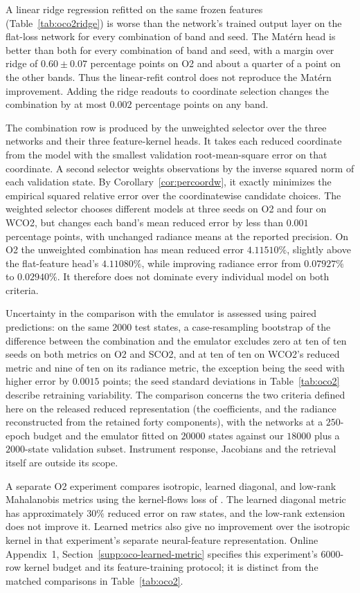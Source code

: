 \documentclass[twoside,11pt]{article}
\begin{document}
A linear ridge regression refitted on the same frozen features
(Table~\ref{tab:oco2ridge}) is worse than the network's trained output layer
on the flat-loss network for every combination of band and seed. The Mat\'ern head is better
than both for every combination of band and seed, with a margin over ridge of
$0.60\pm0.07$ percentage points on O2 and about a quarter of a point on
the other bands. Thus the linear-refit control does not reproduce
the Mat\'ern improvement. Adding the ridge readouts to coordinate selection
changes the combination by at most $0.002$ percentage points on any band.

The combination row is produced by the unweighted selector over the three networks and
their three feature-kernel heads. It takes each reduced
coordinate from the model with the smallest validation root-mean-square
error on that coordinate. A second selector weights observations by the
inverse squared norm of each validation state. By
Corollary~\ref{cor:percoordw}, it exactly minimizes the empirical squared
relative error over the coordinatewise candidate choices. The weighted
selector chooses different models at three seeds on O2 and four on WCO2,
but changes each band's mean reduced error by less than $0.001$ percentage
points, with unchanged radiance means at the reported precision. On O2 the unweighted combination has mean
reduced error $4.11510\%$, slightly above the flat-feature head's
$4.11080\%$, while improving radiance error from $0.07927\%$ to
$0.02940\%$. It therefore does not dominate every individual model on both
criteria.

Uncertainty in the comparison with the emulator is assessed using paired predictions: on the same $2000$ test states,
a case-resampling bootstrap of the difference between the combination and
the emulator excludes zero at ten of ten seeds on both metrics on O2 and
SCO2, and at ten of ten on WCO2's reduced metric and nine of ten on its
radiance metric, the exception being the seed with higher error by $0.0015$ points;
the seed standard deviations in Table~\ref{tab:oco2} describe retraining variability. The comparison concerns the two criteria defined here on the released
reduced representation (the coefficients, and the radiance reconstructed from the retained forty components), with the networks at a $250$-epoch
budget and the emulator fitted on $20000$ states against our $18000$ plus a
$2000$-state validation subset. Instrument response, Jacobians and the
retrieval itself are outside its scope.

A separate O2 experiment compares
isotropic, learned diagonal, and low-rank Mahalanobis metrics using the
kernel-flows loss of \citet{owhadi2019kernel}. The learned diagonal metric
has approximately $30\%$ reduced error on raw states, and the low-rank
extension does not improve it. Learned metrics also give no improvement
over the isotropic kernel in that experiment's separate neural-feature
representation. Online Appendix~1, Section~\ref{supp:oco-learned-metric} specifies this
experiment's 6000-row kernel budget and its feature-training protocol;
it is distinct from the matched comparisons in Table~\ref{tab:oco2}.
\end{document}
